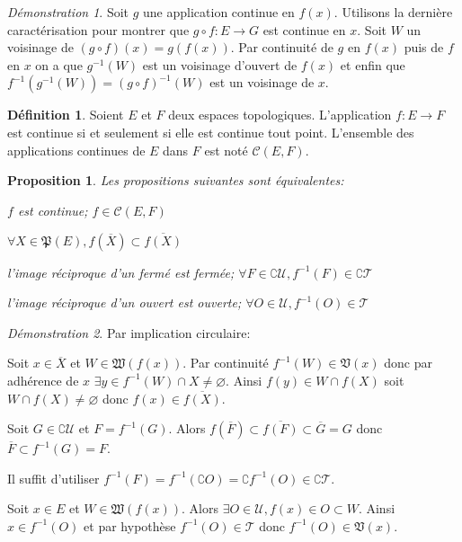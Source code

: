 \documentclass[a4paper, 11pt, french]{book}
\newenvironment{itemise}{\itemize}{\enditemize}
\theoremstyle{plain} %
\newtheorem{proposition}{Proposition}
\theoremstyle{definition} %
\newtheorem{definition}{Définition}
\theoremstyle{remark} %
\newtheorem*{demonstration}{Démonstration}
\newcommand{\1}{\mathds{1}}
\newcommand\vide{\varnothing}
\newcommand{\inv}[1]{#1^{-1}}
\renewcommand{\cal}[1]{\mathcal{#1}}
\renewcommand{\frak}[1]{\mathfrak{#1}}
\newcommand{\scr}[1]{\mathscr{#1}}
\begin{document}
\begin{demonstration}
	Soit $g$ une application continue en $f(x)$.
	Utilisons la dernière caractérisation pour montrer que $g\circ f:E\rightarrow G$ est continue en $x$.
	Soit $W$ un voisinage de $(g\circ f)(x)=g(f(x))$.
	Par continuité de $g$ en $f(x)$ puis de $f$ en $x$ on a que $\inv{g}(W)$ est un voisinage d'ouvert de $f(x)$ et enfin que $\inv{f}(\inv{g}(W))=\inv{(g\circ f)}(W)$ est un voisinage de $x$.
\end{demonstration}

\begin{definition}
	Soient $E$ et $F$ deux espaces topologiques.
	L'application $f\colon E\rightarrow F$ est continue si et seulement si elle est continue tout point.
	L'ensemble des applications continues de $E$ dans $F$ est noté $\mathcal{C}(E, F)$.
\end{definition}

\begin{proposition}
	Les propositions suivantes sont équivalentes:
	\begin{itemise}
		\item $f$ est continue; $f\in\cal{C}(E, F)$
		\item $\forall X\in\frak{P}(E), f(\overline{X})\subset\overline{f(X)}$
		\item l'image réciproque d'un fermé est fermée; $\forall F\in\complement\scr{U}, \inv{f}(F)\in\complement\scr{T}$
		\item l'image réciproque d'un ouvert est ouverte; $\forall O\in\scr{U}, \inv{f}(O)\in\scr{T}$
	\end{itemise}
\end{proposition}

\begin{demonstration}
	Par implication circulaire:
	\begin{itemise}
		\item Soit $x\in\overline{X}$ et $W\in\frak{W}(f(x))$.
		Par continuité $\inv{f}(W)\in\frak{V}(x)$ donc par adhérence de $x$ $\exists y\in\inv{f}(W)\cap X\neq\vide$.
		Ainsi $f(y)\in W\cap f(X)$ soit $W\cap f(X)\neq\vide$ donc $f(x)\in\overline{f(X)}$.
		\item Soit $G\in\complement\scr{U}$ et $F=\inv{f}(G)$.
		Alors $f(\overline{F})\subset\overline{f(F)}\subset\overline{G}=G$ donc $\overline{F}\subset\inv{f}(G)=F$.
		\item Il suffit d'utiliser $\inv{f}(F)=\inv{f}(\complement O)=\complement\inv{f}(O)\in\complement\scr{T}$.
		\item Soit $x\in E$ et $W\in\frak{W}(f(x))$.
		Alors $\exists O\in\scr{U}, f(x)\in O\subset W$.
		Ainsi $x\in\inv{f}(O)$ et par hypothèse $\inv{f}(O)\in\scr{T}$ donc $\inv{f}(O)\in\frak{V}(x)$.
	\end{itemise}
\end{demonstration}
\end{document}
